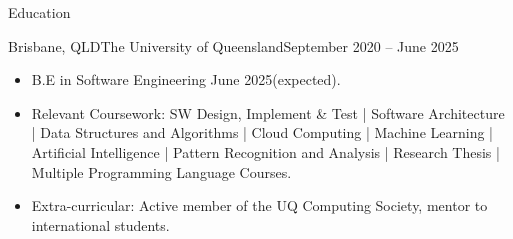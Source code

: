 \documentclass[]{mcdowellcv}
\begin{document}
	\makeheader
	
	\begin{cvsection}{Education}
		\begin{cvsubsection}{Brisbane, QLD}{The University of Queensland}{September 2020 -- June 2025}
			\begin{itemize}
				\item B.E in Software Engineering  June 2025(expected).  
				\item Relevant Coursework: SW Design, Implement & Test | Software Architecture | Data Structures and Algorithms | Cloud Computing | Machine Learning | Artificial Intelligence | Pattern Recognition and Analysis | Research Thesis | Multiple Programming Language Courses.
				\item Extra-curricular: Active member of the UQ Computing Society, mentor to international students.
			\end{itemize}
		\end{cvsubsection}
	\end{cvsection}
\end{document}
